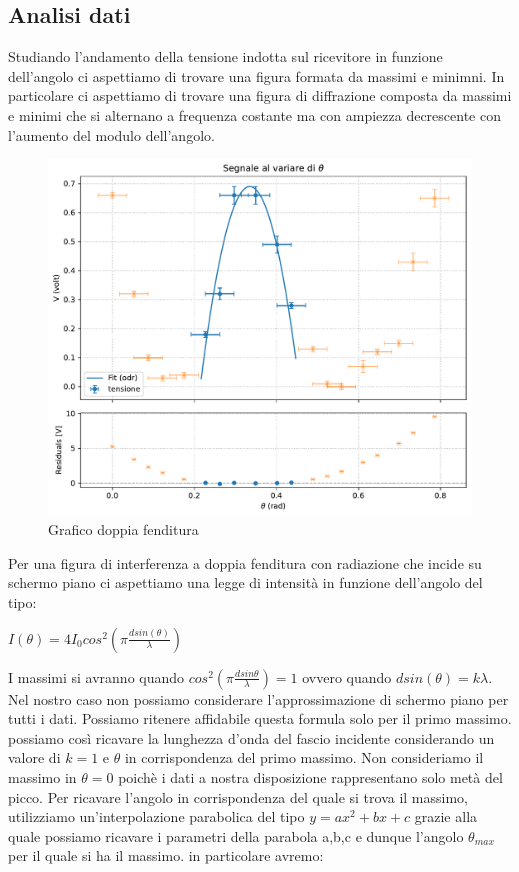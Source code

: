 \documentclass[a4paper]{article}
\begin{document}
\subsection{Analisi dati}
Studiando l'andamento della tensione indotta sul ricevitore in funzione dell'angolo ci aspettiamo di trovare una figura formata da massimi e minimni. In particolare ci aspettiamo di trovare una figura di diffrazione composta da massimi e minimi che si alternano a frequenza costante ma con ampiezza decrescente con l'aumento del modulo dell'angolo. 
\begin{figure}[H]
    \centering
    \includegraphics[width=0.8\linewidth]{grafici/max_doppiafenditura.pdf}
    \caption{Grafico doppia fenditura}
    \label{fig:enter-label}
\end{figure}
Per una figura di interferenza a doppia fenditura con radiazione che incide su schermo piano ci aspettiamo una legge di intensità in funzione dell'angolo del tipo: 
\begin{center}
    $I(\theta)=4I_0cos^2(\pi\frac{d sin(\theta)}{\lambda})$
\end{center}
I massimi si avranno quando $cos^2(\pi\frac{dsin\theta}{\lambda})=1$ ovvero quando $dsin(\theta)=k\lambda$. Nel nostro caso non possiamo considerare l'approssimazione di schermo piano per tutti i dati. Possiamo ritenere affidabile questa formula solo per il primo massimo. possiamo così ricavare la lunghezza d'onda del fascio incidente considerando un valore di $k=1$ e $\theta$ in corrispondenza del primo massimo.
Non consideriamo il massimo in $\theta=0$ poichè i dati a nostra disposizione rappresentano solo metà del picco. Per ricavare l'angolo in corrispondenza del quale si trova il massimo, utilizziamo un'interpolazione parabolica del tipo $y=ax^2+bx+c$ grazie alla quale possiamo ricavare i parametri della parabola a,b,c e dunque l'angolo $\theta_{max}$ per il quale si ha il massimo. in particolare avremo:
\end{document}
